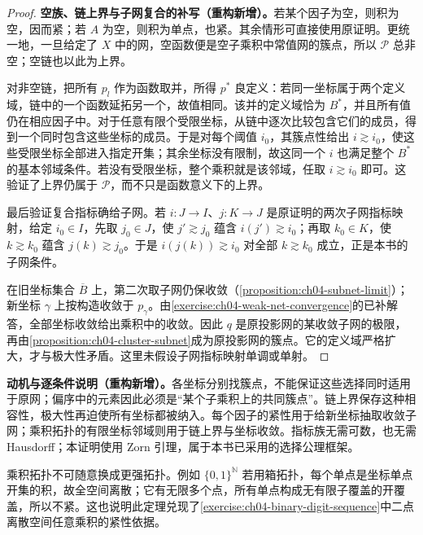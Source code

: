 \documentclass[../../main.tex]{subfiles}%
\begin{document}
\begin{proof}
\textbf{空族、链上界与子网复合的补写（重构新增）。}若某个因子为空，则积为空，因而紧；若 $A$ 为空，则积为单点，也紧。其余情形可直接使用原证明。更统一地，一旦给定了 $X$ 中的网，空函数便是空子乘积中常值网的簇点，所以 $\mathcal P$ 总非空；空链也以此为上界。

对非空链，把所有 $p_l$ 作为函数取并，所得 $p^*$ 良定义：若同一坐标属于两个定义域，链中的一个函数延拓另一个，故值相同。该并的定义域恰为 $B^*$，并且所有值仍在相应因子中。对于任意有限个受限坐标，从链中逐次比较包含它们的成员，得到一个同时包含这些坐标的成员。于是对每个阈值 $i_0$，其簇点性给出 $i\gtrsim i_0$，使这些受限坐标全部进入指定开集；其余坐标没有限制，故这同一个 $i$ 也满足整个 $B^*$ 的基本邻域条件。若没有受限坐标，整个乘积就是该邻域，任取 $i\gtrsim i_0$ 即可。这验证了上界仍属于 $\mathcal P$，而不只是函数意义下的上界。

最后验证复合指标确给子网。若 $i:J\to I$、$j:K\to J$ 是原证明的两次子网指标映射，给定 $i_0\in I$，先取 $j_0\in J$，使 $j'\gtrsim j_0$ 蕴含 $i(j')\gtrsim i_0$；再取 $k_0\in K$，使 $k\gtrsim k_0$ 蕴含 $j(k)\gtrsim j_0$。于是 $i(j(k))\gtrsim i_0$ 对全部 $k\gtrsim k_0$ 成立，正是本书的子网条件。

在旧坐标集合 $\overline B$ 上，第二次取子网仍保收敛（\cref{proposition:ch04-subnet-limit}）；新坐标 $\gamma$ 上按构造收敛于 $p_\gamma$。由\cref{exercise:ch04-weak-net-convergence}的已补解答，全部坐标收敛给出乘积中的收敛。因此 $q$ 是原投影网的某收敛子网的极限，再由\cref{proposition:ch04-cluster-subnet}成为原投影网的簇点。它的定义域严格扩大，才与极大性矛盾。这里未假设子网指标映射单调或单射。
\end{proof}
\begin{remark}
\textbf{动机与逐条件说明（重构新增）。}各坐标分别找簇点，不能保证这些选择同时适用于原网；偏序中的元素因此必须是“某个子乘积上的共同簇点”。链上界保存这种相容性，极大性再迫使所有坐标都被纳入。每个因子的紧性用于给新坐标抽取收敛子网；乘积拓扑的有限坐标邻域则用于链上界与坐标收敛。指标族无需可数，也无需 Hausdorff；本证明使用 Zorn 引理，属于本书已采用的选择公理框架。

乘积拓扑不可随意换成更强拓扑。例如 $\{0,1\}^{\mathbb N}$ 若用箱拓扑，每个单点是坐标单点开集的积，故全空间离散；它有无限多个点，所有单点构成无有限子覆盖的开覆盖，所以不紧。这也说明此定理兑现了\cref{exercise:ch04-binary-digit-sequence}中二点离散空间任意乘积的紧性依据。
\end{remark}
\end{document}
